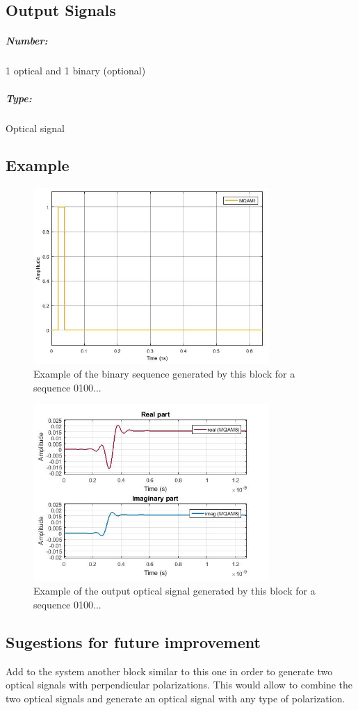 \subsection*{Output Signals}

\subparagraph*{Number:} 1 optical and 1 binary (optional)

\subparagraph*{Type:} Optical signal

\subsection*{Example}

\begin{figure}[h]
	\centering
	\includegraphics[width=0.8\textwidth]{./lib/m_qam_transmitter/figures/BinarySource_output}
	\caption{Example of the binary sequence generated by this block for a sequence 0100...}
\end{figure}

\begin{figure}[h]
	\centering
	\includegraphics[width=0.8\textwidth]{./lib/m_qam_transmitter/figures/IQmodulator0_output}
	\caption{Example of the output optical signal generated by this block for a sequence 0100...}
\end{figure}

\subsection*{Sugestions for future improvement}

Add to the system another block similar to this one in order to generate two optical signals with perpendicular polarizations. This would allow to combine the two optical signals and generate an optical signal with any type of polarization.
